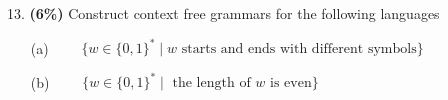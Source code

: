 \documentclass[11pt]{article}
\begin{document}
\medskip
\noindent
%
13. {\bf (6\%)} Construct context free grammars for the following languages
%
\begin{itemize}
 \item[(a)] {$\qquad \{ w \in \{0,1\}^* \mid w \text{ starts and ends with different symbols}\}$}
 \begin{itemize}
    \item[] {
  }
\end{itemize}
 \item[(b)] {$\qquad  \{ w \in \{0,1\}^* \mid \text{ the length of $w$ is even}\}$}
  \begin{itemize}
    \item[] {
  }
\end{itemize}
\end{itemize}



\end{document}
